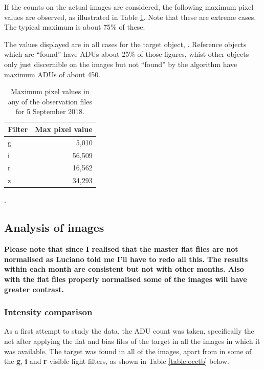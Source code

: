 If the counts on the actual images are considered, the following maximum pixel
values are observed, as illustrated in Table \ref{table:pmaxima}. Note that
these are extreme cases. The typical maximum is about 75\% of these.

The values displayed are in all cases for the target object, \bstar. Reference
objects which are ``found'' have ADUs about 25\% of those figures, whist other
objects only just discernible on the images but not ``found'' by the algorithm
have maximum ADUs of about 450.

\begin{table}[!htbp]
\begin{center}
\begin{tabular}{lr} \hline
Filter & Max pixel value \\\hline
g & 5,010 \\
i & 56,509 \\
r & 16,562 \\
z & 34,293 \\
\hline
\end{tabular}
\end{center}
\caption{Maximum pixel values in any of the observation files for 5 September
2018.}.
\protect\label{table:pmaxima}
\end{table}
\clearpage

\subsection{Analysis of images}
\protect\label{section:analimages}

\textbf{Please note that since I realised that the master flat files are not
normalised as Luciano told me I'll have to redo all this. The results within
each month are consistent but not with other months. Also with the flat files
properly normalised some of the images will have greater contrast.}

\subsubsection{Intensity comparison}
\protect\label{section:intcomp}

As a first attempt to study the data, the ADU count was taken, specifically the
net after applying the flat and bias files of the target in all the images in which it was available.
The target was found in all of the images, apart from in some of the
\textbf{g}, \textbf{i} and \textbf{r} visible light filters, as shown in Table \ref{table:occtb} below.

